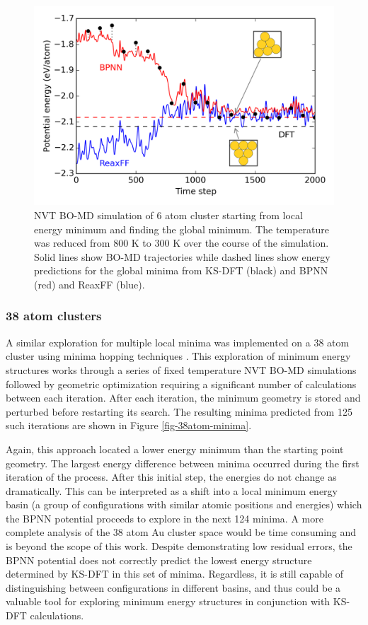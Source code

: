 \documentclass[12pt]{cmuthesis}
\begin{document}
\begin{figure}[h]
\centering
\includegraphics[width=5in]{./images/fig-6atom-md.png}
\caption{\label{fig-6atom-md}
NVT BO-MD simulation of 6 atom cluster starting from local energy minimum and finding the global minimum. The temperature was reduced from 800 K to 300 K over the course of the simulation. Solid lines show BO-MD trajectories while dashed lines show energy predictions for the global minima from KS-DFT (black) and BPNN (red) and ReaxFF (blue).}
\end{figure}

\subsubsection{38 atom clusters}
\label{sec:orgeff77e8}
A similar exploration for multiple local minima was implemented on a 38 atom cluster using minima hopping techniques \cite{goedecker-2004-minim}. This exploration of minimum energy structures works through a series of fixed temperature NVT BO-MD simulations followed by geometric optimization requiring a significant number of calculations between each iteration. After each iteration, the minimum geometry is stored and perturbed before restarting its search. The resulting minima predicted from 125 such iterations are shown in Figure \ref{fig-38atom-minima}.

Again, this approach located a lower energy minimum than the starting point geometry. The largest energy difference between minima occurred during the first iteration of the process. After this initial step, the energies do not change as dramatically. This can be interpreted as a shift into a local minimum energy basin (a group of configurations with similar atomic positions and energies) which the BPNN potential proceeds to explore in the next 124 minima. A more complete analysis of the 38 atom Au cluster space would be time consuming and is beyond the scope of this work. Despite demonstrating low residual errors, the BPNN potential does not correctly predict the lowest energy structure determined by KS-DFT in this set of minima. Regardless, it is still capable of distinguishing between configurations in different basins, and thus could be a valuable tool for exploring minimum energy structures in conjunction with KS-DFT calculations.
\end{document}
